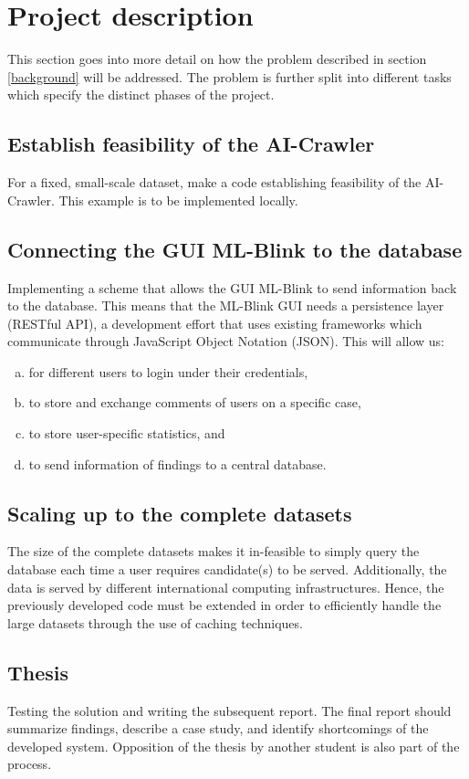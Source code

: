 \section{Project description} \label{description}

This section goes into more detail on how the problem described in section \ref{background} will be addressed. The problem is further split into different tasks which specify the distinct phases of the project.

\subsection{Establish feasibility of the AI-Crawler}

For a fixed, small-scale dataset, make a code establishing feasibility of the AI-Crawler. This example is to be implemented locally.

\subsection{Connecting the GUI ML-Blink to the database}

Implementing a scheme that allows the GUI ML-Blink to send information back to the database. This means that the ML-Blink GUI needs a persistence layer (RESTful API), a development effort that uses existing frameworks which communicate through JavaScript Object Notation (JSON).  This will allow us:

\begin{enumerate}[(a)]
  \item for different users to login under their credentials,
  \item to store and exchange comments of users on a specific case,
  \item to store user-specific statistics, and
  \item to send information of findings to a central database.
\end{enumerate}

\subsection{Scaling up to the complete datasets}

The size of the complete datasets makes it in-feasible to simply query the database each time a user requires candidate(s) to be served. Additionally, the data is served by different international computing infrastructures. Hence, the previously developed code must be extended in order to efficiently handle the large datasets through the use of caching techniques.

\subsection{Thesis}

Testing the solution and writing the subsequent report. The final report should summarize findings, describe a case study, and identify shortcomings of the developed system. Opposition of the thesis by another student is also part of the process.
